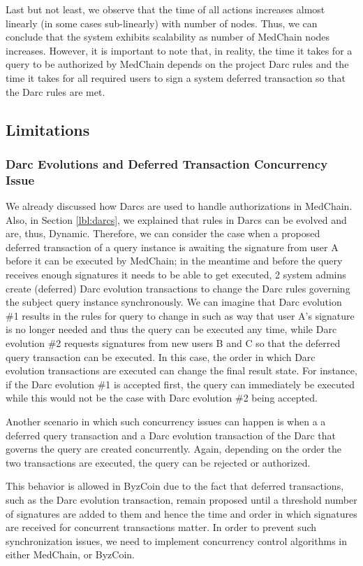 Last but not least, we observe that the time of all actions increases almost linearly (in some cases sub-linearly) with number of nodes. Thus, we can conclude that the system exhibits scalability as number of MedChain nodes increases. However, it is important to note that, in reality, the time it takes for a query to be authorized by MedChain depends on the project Darc rules and the time it takes for all required users to sign a system deferred transaction so that the Darc rules are met. 

\subsection{Limitations}

\subsubsection{Darc Evolutions and Deferred Transaction Concurrency Issue}
We already discussed how Darcs are used to handle authorizations in MedChain. Also, in Section \ref{lbl:darcs}, we explained that rules in Darcs can be evolved and are, thus, Dynamic. Therefore, we can consider the case when a proposed deferred transaction of a query instance is awaiting the signature from user A before it can be executed by MedChain; in the meantime and before the query receives enough signatures it needs to be able to get executed, 2 system admins create (deferred) Darc evolution transactions to change the Darc rules governing the subject query instance synchronously. We can imagine that Darc evolution \#1 results in the rules for query to change in such as way that user A's signature is no longer needed and thus the query can be executed any time, while Darc evolution \#2 requests signatures from new users B and C so that the deferred query transaction can be executed. In this case, the order in which Darc evolution transactions are executed can change the final result state. For instance, if the Darc evolution \#1 is accepted first, the query can immediately be executed while this would not be the case with Darc evolution \#2 being accepted.

Another scenario in which such concurrency issues can happen is when a a deferred query transaction and a Darc evolution transaction of the Darc that governs the query are created concurrently. Again, depending on the order the two transactions are executed, the query can be rejected or authorized. 

This behavior is allowed in ByzCoin due to the fact that deferred transactions, such as the Darc evolution transaction, remain proposed until a threshold number of signatures are added to them and hence the time and order in which signatures are received for concurrent transactions matter. In order to prevent such synchronization issues, we need to implement concurrency control algorithms in either MedChain, or ByzCoin.   


